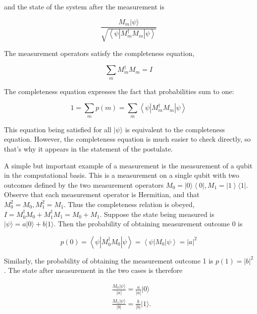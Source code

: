 \documentclass[10pt]{article}
\begin{document}
and the state of the system after the measurement is


\begin{equation*}
\frac{M_{m}|\psi\rangle}{\sqrt{\left\langle\psi\left|M_{m}^{\dagger} M_{m}\right| \psi\right\rangle}} \tag{2.93}
\end{equation*}


The measurement operators satisfy the completeness equation,


\begin{equation*}
\sum_{m} M_{m}^{\dagger} M_{m}=I \tag{2.94}
\end{equation*}


The completeness equation expresses the fact that probabilities sum to one:


\begin{equation*}
1=\sum_{m} p(m)=\sum_{m}\left\langle\psi\left|M_{m}^{\dagger} M_{m}\right| \psi\right\rangle \tag{2.95}
\end{equation*}


This equation being satisfied for all $|\psi\rangle$ is equivalent to the completeness equation. However, the completeness equation is much easier to check directly, so that's why it appears in the statement of the postulate.

A simple but important example of a measurement is the measurement of a qubit in the computational basis. This is a measurement on a single qubit with two outcomes defined by the two measurement operators $M_{0}=|0\rangle\left\langle 0\left|, M_{1}=\right| 1\right\rangle\langle 1|$. Observe that each measurement operator is Hermitian, and that $M_{0}^{2}=M_{0}, M_{1}^{2}=M_{1}$. Thus the completeness relation is obeyed, $I=M_{0}^{\dagger} M_{0}+M_{1}^{\dagger} M_{1}=M_{0}+M_{1}$. Suppose the state being measured is $|\psi\rangle=a|0\rangle+b|1\rangle$. Then the probability of obtaining measurement outcome 0 is


\begin{equation*}
p(0)=\left\langle\psi\left|M_{0}^{\dagger} M_{0}\right| \psi\right\rangle=\left\langle\psi\left|M_{0}\right| \psi\right\rangle=|a|^{2} \tag{2.96}
\end{equation*}


Similarly, the probability of obtaining the measurement outcome 1 is $p(1)=|b|^{2}$. The state after measurement in the two cases is therefore


\begin{align*}
& \frac{M_{0}|\psi\rangle}{|a|}=\frac{a}{|a|}|0\rangle  \tag{2.97}\\
& \frac{M_{1}|\psi\rangle}{|b|}=\frac{b}{|b|}|1\rangle . \tag{2.98}
\end{align*}
\end{document}
